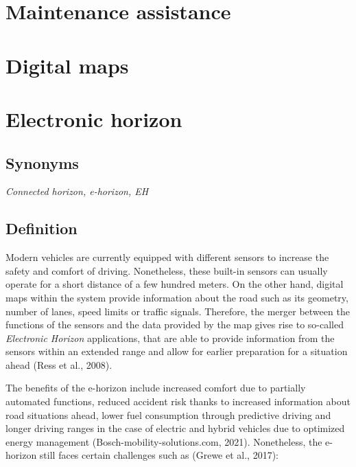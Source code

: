 \documentclass[
]{book}
\begin{document}
\hypertarget{maintenance_assis}{%
\section{Maintenance assistance}\label{maintenance_assis}}

\hypertarget{digital_maps}{%
\section{Digital maps}\label{digital_maps}}

\hypertarget{ehorizon}{%
\section{Electronic horizon}\label{ehorizon}}

\hypertarget{synonyms-15}{%
\subsection*{Synonyms}\label{synonyms-15}}

\emph{Connected horizon, e-horizon, EH}

\hypertarget{definition-17}{%
\subsection*{Definition}\label{definition-17}}

Modern vehicles are currently equipped with different sensors to increase the safety and comfort of driving. Nonetheless, these built-in sensors can usually operate for a short distance of a few hundred meters. On the other hand, digital maps within the system provide information about the road such as its geometry, number of lanes, speed limits or traffic signals. Therefore, the merger between the functions of the sensors and the data provided by the map gives rise to so-called \emph{Electronic Horizon} applications, that are able to provide information from the sensors within an extended range and allow for earlier preparation for a situation ahead (Ress et al., 2008).

The benefits of the e-horizon include increased comfort due to partially automated functions, reduced accident risk thanks to increased information about road situations ahead, lower fuel consumption through predictive driving and longer driving ranges in the case of electric and hybrid vehicles due to optimized energy management (Bosch-mobility-solutions.com, 2021). Nonetheless, the e-horizon still faces certain challenges such as (Grewe et al., 2017):
\end{document}
